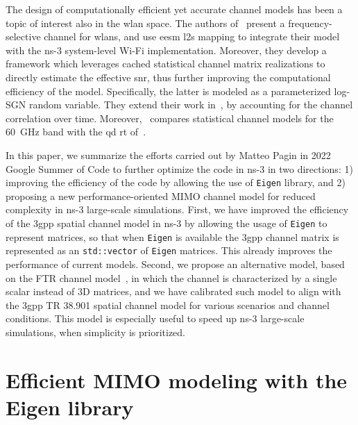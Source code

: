 The design of computationally efficient yet accurate channel models has been a topic of interest also in the \gls{wlan} space. The authors of~\cite{jin2020efficient, jin2021efficient} present a frequency-selective channel for \glspl{wlan}, and use \gls{eesm} \gls{l2s} mapping to integrate their model with the ns-3 system-level Wi-Fi implementation. Moreover, they develop a framework which leverages cached statistical channel matrix realizations to directly estimate the effective \gls{snr}, thus further improving the computational efficiency of the model. Specifically, the latter is modeled as a parameterized log-SGN random variable. They extend their work in~\cite{jin2021eesm}, by accounting for the channel correlation over time. 
Moreover,~\cite{liu2021performance} compares statistical channel models for the 60~GHz band with the \gls{qd} \gls{rt} of~\cite{QD}.

In this paper, we summarize the efforts carried out by Matteo Pagin in 2022 Google Summer of Code to further optimize the code in ns-3 in two directions: 1) improving the efficiency of the code by allowing the use of \texttt{Eigen} library, and 2) proposing a new performance-oriented MIMO channel model for reduced complexity in ns-3 large-scale simulations. First, we have improved the efficiency of the \gls{3gpp} spatial channel model in ns-3 by allowing the usage of \texttt{Eigen} to represent matrices, so that when \texttt{Eigen} is available the \gls{3gpp} channel matrix is represented as an \texttt{std::vector} of \texttt{Eigen} matrices. This already improves the performance of current models. Second, we propose an alternative model, based on the FTR channel model~\cite{7917287}, in which the channel is characterized by a single scalar instead of 3D matrices, and we have calibrated such model to align with the \gls{3gpp} TR 38.901 spatial channel model for various scenarios and channel conditions. This model is especially useful to speed up ns-3 large-scale simulations, when simplicity is prioritized.


\section{Efficient MIMO modeling with the Eigen library}
\label{sec:opt_code}


